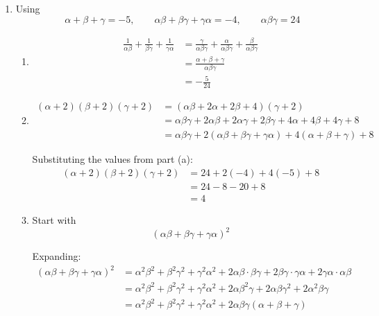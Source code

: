 \documentclass[leqno]{article}
\begin{document}
\begin{enumerate}[
  label=\textbf{\arabic*.},
  leftmargin=*,
  topsep=0pt,
  partopsep=0pt,
  parsep=0pt
]
\begin{djsSolution}
\begin{enumerate}[label=\textbf{(\alph*)}]
  with roots \(\alpha\), \(\beta\), \(\gamma\), the relations between the roots and coefficients are
  \[
  \alpha+\beta+\gamma=-\frac{b}{a},\qquad \alpha\beta+\beta\gamma+\gamma\alpha=\frac{c}{a},\qquad \alpha\beta\gamma=-\frac{d}{a}
  \]

  Here
  \[
  x^3+5x^2-4x-24=0
  \]

  so
  \[
  \alpha+\beta+\gamma=-5,\qquad \alpha\beta+\beta\gamma+\gamma\alpha=-4,\qquad \alpha\beta\gamma=24
  \]

  \item Using
  \[
  \alpha+\beta+\gamma=-5,\qquad \alpha\beta+\beta\gamma+\gamma\alpha=-4,\qquad \alpha\beta\gamma=24
  \]

  \begin{enumerate}[label=(\roman*)]
    \item
    \begin{align*}
    \frac{1}{\alpha\beta}+\frac{1}{\beta\gamma}+\frac{1}{\gamma\alpha}
    &=\frac{\gamma}{\alpha\beta\gamma}+\frac{\alpha}{\alpha\beta\gamma}+\frac{\beta}{\alpha\beta\gamma} \\
    &=\frac{\alpha+\beta+\gamma}{\alpha\beta\gamma} \\
    &=-\frac{5}{24}
    \end{align*}

    \item
    \begin{align*}
    (\alpha+2)(\beta+2)(\gamma+2)
    &=(\alpha\beta+2\alpha+2\beta+4)(\gamma+2) \\
    &=\alpha\beta\gamma+2\alpha\beta+2\alpha\gamma+2\beta\gamma+4\alpha+4\beta+4\gamma+8 \\
    &=\alpha\beta\gamma+2(\alpha\beta+\beta\gamma+\gamma\alpha)+4(\alpha+\beta+\gamma)+8
    \end{align*}

    Substituting the values from part (a):
    \begin{align*}
    (\alpha+2)(\beta+2)(\gamma+2)
    &=24+2(-4)+4(-5)+8 \\
    &=24-8-20+8 \\
    &=4
    \end{align*}

    \item Start with
    \[
    (\alpha\beta+\beta\gamma+\gamma\alpha)^2
    \]

    Expanding:
    \begin{align*}
    (\alpha\beta+\beta\gamma+\gamma\alpha)^2
    &=\alpha^2\beta^2+\beta^2\gamma^2+\gamma^2\alpha^2
    +2\alpha\beta\cdot\beta\gamma+2\beta\gamma\cdot\gamma\alpha+2\gamma\alpha\cdot\alpha\beta \\
    &=\alpha^2\beta^2+\beta^2\gamma^2+\gamma^2\alpha^2
    +2\alpha\beta^2\gamma+2\alpha\beta\gamma^2+2\alpha^2\beta\gamma \\
    &=\alpha^2\beta^2+\beta^2\gamma^2+\gamma^2\alpha^2
    +2\alpha\beta\gamma(\alpha+\beta+\gamma)
    \end{align*}


\end{enumerate}
\end{enumerate}
\end{djsSolution}
\end{enumerate}
\end{document}
